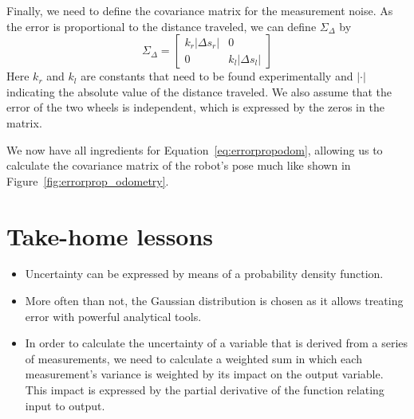Finally, we need to define the covariance matrix for the measurement noise. As the error is proportional to the distance traveled, we can define $ \Sigma_{\Delta}$ by
\begin{equation}
\Sigma_{\Delta}=\left[\begin{array}{cc}k_r|\Delta s_r| & 0\\0 & k_l|\Delta s_l|\end{array}\right]
\end{equation}
Here $ k_r$ and $ k_l$ are constants that need to be found experimentally and $ |\cdot |$ indicating the absolute value of the distance traveled. We also assume that the error of the two wheels is independent, which is expressed by the zeros in the matrix.

We now have all ingredients for Equation~\ref{eq:errorpropodom}, allowing us to calculate the covariance matrix of the robot's pose much like shown in Figure~\ref{fig:errorprop_odometry}.

\section{Take-home lessons}
\begin{itemize}
\item Uncertainty can be expressed by means of a probability density function.
\item More often than not, the Gaussian distribution is chosen as it allows treating error with powerful analytical tools.
\item In order to calculate the uncertainty of a variable that is derived from a series of measurements, we need to calculate a weighted sum in which each measurement's variance is weighted by its impact on the output variable. This impact is expressed by the partial derivative of the function relating input to output.
\end{itemize}

